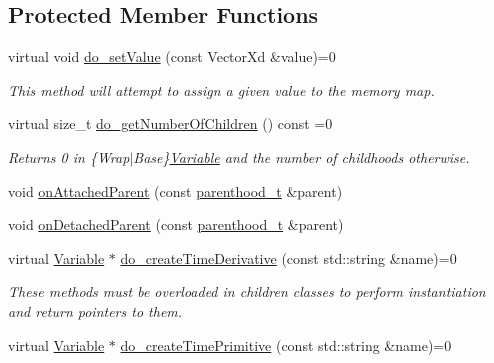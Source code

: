\subsection*{Protected Member Functions}
\begin{DoxyCompactItemize}
\item 
virtual void \hyperlink{classocra_1_1Variable_a73ff767d0a620f1803573b33f93c69f8}{do\+\_\+set\+Value} (const Vector\+Xd \&value)=0
\begin{DoxyCompactList}\small\item\em This method will attempt to assign a given value to the memory map. \end{DoxyCompactList}\item 
virtual size\+\_\+t \hyperlink{classocra_1_1Variable_a65de5b31613b74d83baab58f0eb43b35}{do\+\_\+get\+Number\+Of\+Children} () const =0
\begin{DoxyCompactList}\small\item\em Returns 0 in \{Wrap$\vert$\+Base\}\hyperlink{classocra_1_1Variable}{Variable} and the number of childhoods otherwise. \end{DoxyCompactList}\end{DoxyCompactItemize}
{\bf }\par
\begin{DoxyCompactItemize}
\item 
void \hyperlink{classocra_1_1Variable_ab339e31cd4d90b2741154ae4795641f1}{on\+Attached\+Parent} (const \hyperlink{classocra_1_1Variable_a88444b2124cf5aab069f46734822f31f}{parenthood\+\_\+t} \&parent)
\item 
void \hyperlink{classocra_1_1Variable_a95c1891e66fcf6122c444095e7dd4c44}{on\+Detached\+Parent} (const \hyperlink{classocra_1_1Variable_a88444b2124cf5aab069f46734822f31f}{parenthood\+\_\+t} \&parent)
\end{DoxyCompactItemize}

{\bf }\par
\begin{DoxyCompactItemize}
\item 
virtual \hyperlink{classocra_1_1Variable}{Variable} $\ast$ \hyperlink{classocra_1_1Variable_aaed3c9bb3258cc1120ae8f93722a12bb}{do\+\_\+create\+Time\+Derivative} (const std\+::string \&name)=0
\begin{DoxyCompactList}\small\item\em These methods must be overloaded in children classes to perform instantiation and return pointers to them. \end{DoxyCompactList}\item 
virtual \hyperlink{classocra_1_1Variable}{Variable} $\ast$ \hyperlink{classocra_1_1Variable_ae37610cbde7630dcda3dd6e09e251057}{do\+\_\+create\+Time\+Primitive} (const std\+::string \&name)=0
\end{DoxyCompactItemize}

